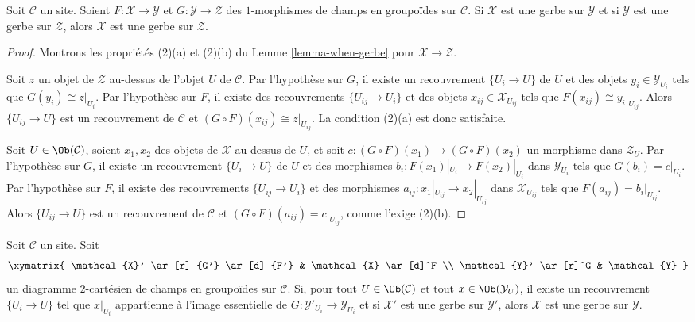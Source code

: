 \begin{lemma}
\label{lemma-composition-gerbe}
Soit $\mathcal{C}$ un site. Soient
$F : \mathcal{X} \to \mathcal{Y}$ et $G : \mathcal{Y} \to \mathcal{Z}$
des $1$-morphismes de champs en groupoïdes sur $\mathcal{C}$.
Si $\mathcal{X}$ est une gerbe sur $\mathcal{Y}$ et si
$\mathcal{Y}$ est une gerbe sur $\mathcal{Z}$, alors
$\mathcal{X}$ est une gerbe sur $\mathcal{Z}$.
\end{lemma}

\begin{proof}
Montrons les propriétés (2)(a) et (2)(b) du
Lemme \ref{lemma-when-gerbe}
pour $\mathcal{X} \to \mathcal{Z}$.

\medskip\noindent
Soit $z$ un objet de $\mathcal{Z}$ au-dessus de l'objet $U$
de $\mathcal{C}$. Par l'hypothèse sur $G$, il existe
un recouvrement $\{U_i \to U\}$ de $U$ et des objets
$y_i \in \mathcal{Y}_{U_i}$ tels que $G(y_i) \cong z|_{U_i}$.
Par l'hypothèse sur $F$, il existe des recouvrements $\{U_{ij} \to U_i\}$
et des objets $x_{ij} \in \mathcal{X}_{U_{ij}}$ tels que
$F(x_{ij}) \cong y_i|_{U_{ij}}$.
Alors $\{U_{ij} \to U\}$ est un recouvrement de $\mathcal{C}$
et $(G \circ F)(x_{ij}) \cong z|_{U_{ij}}$. La condition (2)(a) est donc satisfaite.

\medskip\noindent
Soit $U \in \Ob(\mathcal{C})$, soient $x_1, x_2$ des objets de
$\mathcal{X}$ au-dessus de $U$, et soit
$c : (G \circ F)(x_1) \to (G \circ F)(x_2)$ un morphisme dans
$\mathcal{Z}_U$. Par l'hypothèse sur $G$, il existe
un recouvrement $\{U_i \to U\}$ de $U$ et des morphismes
$b_i : F(x_1)|_{U_i} \to F(x_2)|_{U_i}$ dans $\mathcal{Y}_{U_i}$
tels que $G(b_i) = c|_{U_i}$.
Par l'hypothèse sur $F$, il existe des recouvrements $\{U_{ij} \to U_i\}$
et des morphismes $a_{ij} : x_1|_{U_{ij}} \to x_2|_{U_{ij}}$ dans
$\mathcal{X}_{U_{ij}}$ tels que $F(a_{ij}) = b_i|_{U_{ij}}$.
Alors $\{U_{ij} \to U\}$ est un recouvrement de $\mathcal{C}$
et $(G \circ F)(a_{ij}) = c|_{U_{ij}}$, comme l'exige (2)(b).
\end{proof}

\begin{lemma}
\label{lemma-gerbe-descent}
Soit $\mathcal{C}$ un site. Soit
$$
\xymatrix{
\mathcal{X}' \ar[r]_{G'} \ar[d]_{F'} & \mathcal{X} \ar[d]^F \\
\mathcal{Y}' \ar[r]^G & \mathcal{Y}
}
$$
un diagramme $2$-cartésien de champs en groupoïdes sur $\mathcal{C}$.
Si, pour tout $U \in \Ob(\mathcal{C})$ et tout
$x \in \Ob(\mathcal{Y}_U)$, il existe un recouvrement
$\{U_i \to U\}$ tel que $x|_{U_i}$ appartienne à l'image
essentielle de $G : \mathcal{Y}'_{U_i} \to \mathcal{Y}_{U_i}$ et si
$\mathcal{X}'$ est une gerbe sur $\mathcal{Y}'$, alors
$\mathcal{X}$ est une gerbe sur $\mathcal{Y}$.
\end{lemma}

